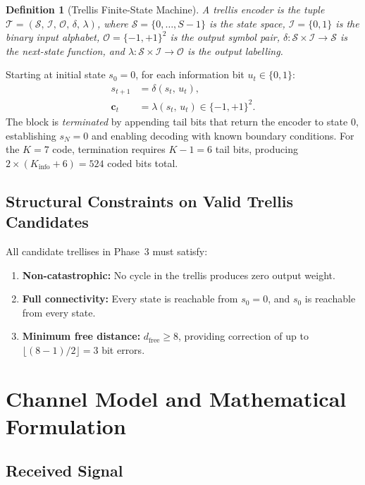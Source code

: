 \documentclass[11pt,a4paper]{article}
\newtheorem{definition}{Definition}[section]
\newcommand{\dfree}{d_{\text{free}}}
\begin{document}
\begin{definition}[Trellis Finite-State Machine]
A trellis encoder is the tuple $\mathcal{T} = (\mathcal{S},\,\mathcal{I},\,\mathcal{O},\,\delta,\,\lambda)$, where
$\mathcal{S} = \{0,\ldots,S-1\}$ is the state space,
$\mathcal{I} = \{0,1\}$ is the binary input alphabet,
$\mathcal{O} = \{-1,+1\}^2$ is the output symbol pair,
$\delta : \mathcal{S} \times \mathcal{I} \to \mathcal{S}$ is the next-state function, and
$\lambda : \mathcal{S} \times \mathcal{I} \to \mathcal{O}$ is the output labelling.
\end{definition}

Starting at initial state $s_0 = 0$, for each information bit $u_t \in \{0,1\}$:
\begin{align}
  s_{t+1} &= \delta(s_t,\, u_t), \\
  \mathbf{c}_t &= \lambda(s_t,\, u_t) \in \{-1,+1\}^2.
\end{align}
The block is \emph{terminated} by appending tail bits that return the encoder to state $0$, establishing $s_N = 0$ and enabling decoding with known boundary conditions. For the $K=7$ code, termination requires $K-1 = 6$ tail bits, producing $2 \times (K_{\text{info}} + 6) = 524$ coded bits total.

\subsection{Structural Constraints on Valid Trellis Candidates}

All candidate trellises in Phase~3 must satisfy:
\begin{enumerate}
  \item \textbf{Non-catastrophic:} No cycle in the trellis produces zero output weight.
  \item \textbf{Full connectivity:} Every state is reachable from $s_0 = 0$, and $s_0$ is reachable from every state.
  \item \textbf{Minimum free distance:} $\dfree \geq 8$, providing correction of up to $\lfloor(8-1)/2\rfloor = 3$ bit errors.
\end{enumerate}

\section{Channel Model and Mathematical Formulation}

\subsection{Received Signal}
\end{document}
